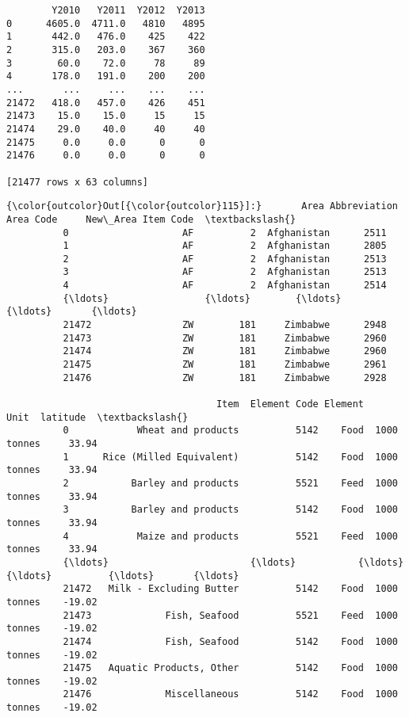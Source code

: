 \documentclass[11pt]{article}
\begin{document}
\begin{verbatim}
        Y2010   Y2011  Y2012  Y2013  
0      4605.0  4711.0   4810   4895  
1       442.0   476.0    425    422  
2       315.0   203.0    367    360  
3        60.0    72.0     78     89  
4       178.0   191.0    200    200  
...       ...     ...    ...    ...  
21472   418.0   457.0    426    451  
21473    15.0    15.0     15     15  
21474    29.0    40.0     40     40  
21475     0.0     0.0      0      0  
21476     0.0     0.0      0      0  

[21477 rows x 63 columns]
    \end{verbatim}

    
\begin{Verbatim}[commandchars=\\\{\}]
{\color{outcolor}Out[{\color{outcolor}115}]:}       Area Abbreviation  Area Code     New\_Area Item Code  \textbackslash{}
          0                    AF          2  Afghanistan      2511   
          1                    AF          2  Afghanistan      2805   
          2                    AF          2  Afghanistan      2513   
          3                    AF          2  Afghanistan      2513   
          4                    AF          2  Afghanistan      2514   
          {\ldots}                 {\ldots}        {\ldots}          {\ldots}       {\ldots}   
          21472                ZW        181     Zimbabwe      2948   
          21473                ZW        181     Zimbabwe      2960   
          21474                ZW        181     Zimbabwe      2960   
          21475                ZW        181     Zimbabwe      2961   
          21476                ZW        181     Zimbabwe      2928   
          
                                     Item  Element Code Element         Unit  latitude  \textbackslash{}
          0            Wheat and products          5142    Food  1000 tonnes     33.94   
          1      Rice (Milled Equivalent)          5142    Food  1000 tonnes     33.94   
          2           Barley and products          5521    Feed  1000 tonnes     33.94   
          3           Barley and products          5142    Food  1000 tonnes     33.94   
          4            Maize and products          5521    Feed  1000 tonnes     33.94   
          {\ldots}                         {\ldots}           {\ldots}     {\ldots}          {\ldots}       {\ldots}   
          21472   Milk - Excluding Butter          5142    Food  1000 tonnes    -19.02   
          21473             Fish, Seafood          5521    Feed  1000 tonnes    -19.02   
          21474             Fish, Seafood          5142    Food  1000 tonnes    -19.02   
          21475   Aquatic Products, Other          5142    Food  1000 tonnes    -19.02   
          21476             Miscellaneous          5142    Food  1000 tonnes    -19.02   
          

\end{Verbatim}
\end{document}
